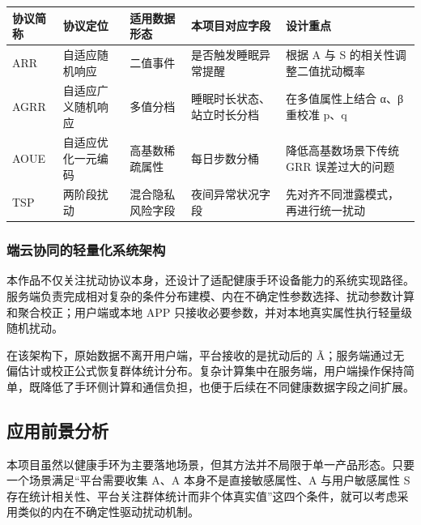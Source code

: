 \documentclass{cumcmthesis}
\numberwithin{equation}{section}
\numberwithin{figure}{section}
\numberwithin{table}{section}
\begin{document}
\begin{table}[htbp]
\centering
\small
\begin{tabularx}{\textwidth}{|>{\raggedright\arraybackslash}X|>{\raggedright\arraybackslash}X|>{\raggedright\arraybackslash}X|>{\raggedright\arraybackslash}X|>{\raggedright\arraybackslash}X|}
\hline
协议简称 & 协议定位 & 适用数据形态 & 本项目对应字段 & 设计重点 \\ \hline
ARR & 自适应随机响应 & 二值事件 & 是否触发睡眠异常提醒 & 根据 A 与 S 的相关性调整二值扰动概率 \\ \hline
AGRR & 自适应广义随机响应 & 多值分档 & 睡眠时长状态、站立时长分档 & 在多值属性上结合 α、β 重校准 p、q \\ \hline
AOUE & 自适应优化一元编码 & 高基数稀疏属性 & 每日步数分桶 & 降低高基数场景下传统 GRR 误差过大的问题 \\ \hline
TSP & 两阶段扰动 & 混合隐私风险字段 & 夜间异常状况字段 & 先对齐不同泄露模式，再进行统一扰动 \\ \hline
\end{tabularx}
\end{table}

\subsubsection{端云协同的轻量化系统架构}

本作品不仅关注扰动协议本身，还设计了适配健康手环设备能力的系统实现路径。服务端负责完成相对复杂的条件分布建模、内在不确定性参数选择、扰动参数计算和聚合校正；用户端或本地 APP 只接收必要参数，并对本地真实属性执行轻量级随机扰动。

在该架构下，原始数据不离开用户端，平台接收的是扰动后的 Ã；服务端通过无偏估计或校正公式恢复群体统计分布。复杂计算集中在服务端，用户端操作保持简单，既降低了手环侧计算和通信负担，也便于后续在不同健康数据字段之间扩展。

\subsection{应用前景分析}

本项目虽然以健康手环为主要落地场景，但其方法并不局限于单一产品形态。只要一个场景满足“平台需要收集 A、A 本身不是直接敏感属性、A 与用户敏感属性 S 存在统计相关性、平台关注群体统计而非个体真实值”这四个条件，就可以考虑采用类似的内在不确定性驱动扰动机制。
\end{document}
